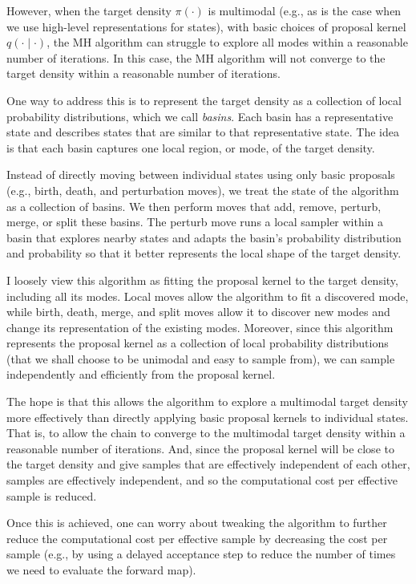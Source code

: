\documentclass[12pt]{article}
\theoremstyle{definition}
\theoremstyle{remark}
\theoremstyle{plain}
\begin{document}
However, when the target density $\pi(\cdot)$ is multimodal 
(e.g., as is the case when we use high-level representations for states), 
with basic choices of proposal kernel $q(\cdot\mid\cdot)$,
the MH algorithm can struggle to explore all modes within a reasonable number of iterations.
In this case, the MH algorithm will not converge to the target density within a reasonable number of iterations. 

One way to address this is to 
represent the target density as a collection of local probability distributions, which we call \textit{basins}.
Each basin has a representative state and describes states that are similar to that representative state.
The idea is that each basin captures one local region, or mode, of the target density.

Instead of directly moving between individual states using only basic proposals (e.g., birth, death, and perturbation moves),
we treat the state of the algorithm as a collection of basins.
We then perform moves that add, remove, perturb, merge, or split these basins.
The perturb move runs a local sampler within a basin that explores nearby states 
and adapts the basin's probability distribution and probability so that it better represents the local shape of the target density.

I loosely view this algorithm as fitting the proposal kernel to the target density, 
including all its modes. Local moves allow the algorithm to fit a discovered mode, 
while birth, death, merge, and split moves allow it to discover new modes and change its representation of the existing modes.
Moreover, since this algorithm represents the proposal kernel as a collection of local probability distributions 
(that we shall choose to be unimodal and easy to sample from), we can sample independently and efficiently from the proposal kernel.

The hope is that this allows the algorithm to explore a multimodal target density more effectively 
than directly applying basic proposal kernels to individual states. 
That is, to allow the chain to converge to the multimodal target density within a reasonable number of iterations. 
And, since the proposal kernel will be close to the target density
and give samples that are effectively independent of each other, 
samples are effectively independent, and so the computational cost per effective sample is reduced.

Once this is achieved, one can worry about tweaking the algorithm to further reduce the computational cost per effective sample 
by decreasing the cost per sample (e.g., by using a delayed acceptance step to reduce the number of times we need to evaluate the forward map).
\end{document}

